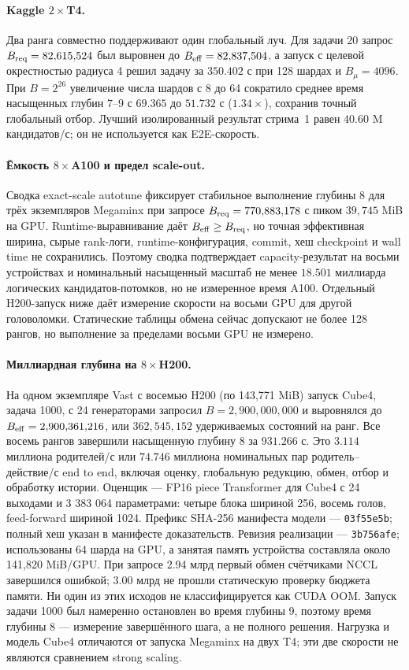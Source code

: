 \documentclass[10pt,twocolumn]{article}
\begin{document}
\paragraph{Kaggle $2\times$T4.}
Два ранга совместно поддерживают один глобальный луч. Для задачи 20 запрос
$B_{\rm req}=82{,}615{,}524$ был выровнен до
$B_{\rm eff}=82{,}837{,}504$, а запуск с целевой окрестностью радиуса 4 решил
задачу за $350.402$ с при 128 шардах и $B_\mu=4096$. При
$B=2^{26}$ увеличение числа шардов с 8 до 64 сократило среднее время насыщенных
глубин 7--9 с $69.365$ до $51.732$ с ($1.34\times$), сохранив точный глобальный
отбор. Лучший изолированный результат стрима~1 равен $40.60$ M кандидатов/с;
он не используется как E2E-скорость.

\paragraph{Ёмкость $8\times$A100 и предел scale-out.}
Сводка exact-scale autotune фиксирует стабильное выполнение глубины 8
для трёх экземпляров Megaminx при запросе
$B_{\rm req}=770{,}883{,}178$ с пиком $39{,}745$ MiB на GPU. Runtime-выравнивание
даёт $B_{\rm eff}\geq B_{\rm req}$, но точная эффективная ширина, сырые rank-логи,
runtime-конфигурация, commit, хеш checkpoint и wall time не сохранились. Поэтому
сводка подтверждает capacity-результат на восьми устройствах и номинальный
насыщенный масштаб не менее $18.501$ миллиарда логических кандидатов-потомков,
но не измеренное время A100. Отдельный H200-запуск ниже даёт измерение скорости
на восьми GPU для другой головоломки. Статические таблицы обмена сейчас
допускают не более 128 рангов, но выполнение за пределами восьми GPU не измерено.

\paragraph{Миллиардная глубина на $8\times$H200.}
На одном экземпляре Vast с восемью H200 (по 143,771 MiB) запуск Cube4,
задача 1000, с 24 генераторами запросил $B=2{,}900{,}000{,}000$ и выровнялся
до $B_{\rm eff}=2{,}900{,}361{,}216$, или $362{,}545{,}152$ удерживаемых
состояний на ранг. Все восемь рангов завершили насыщенную глубину 8 за
$931.266$ с. Это $3.114$ миллиона родителей/с или $74.746$ миллиона
номинальных пар родитель--действие/с end to end, включая оценку, глобальную
редукцию, обмен, отбор и обработку истории. Оценщик --- FP16 piece Transformer
для Cube4 с 24 выходами и 3 383 064 параметрами: четыре блока шириной 256,
восемь голов, feed-forward шириной 1024. Префикс SHA-256 манифеста модели ---
\texttt{03f55e5b}; полный хеш указан в манифесте доказательств. Ревизия
реализации --- \texttt{3b756afe}; использованы 64 шарда на GPU, а занятая
память устройства составляла около 141,820 MiB/GPU. При запросе 2.94 млрд
первый обмен счётчиками NCCL завершился ошибкой; 3.00 млрд не прошли статическую
проверку бюджета памяти. Ни один из этих исходов не классифицируется как CUDA
OOM. Запуск задачи 1000 был намеренно остановлен во время глубины 9, поэтому
время глубины 8 --- измерение завершённого шага, а не полного решения.
Нагрузка и модель Cube4 отличаются от запуска Megaminx на двух T4; эти две
скорости не являются сравнением strong scaling.
\end{document}
